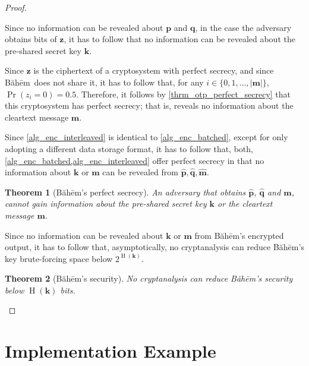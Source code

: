 \documentclass[twocolumn]{article}
\newcommand{\baheem}{Băhēm}
\DeclareMathOperator{\entropy}{H}
\newtheorem{theorem}{Theorem}[section]
\begin{document}
\begin{proof}
\begin{description}[itemsep=0em]
\begin{description}[itemsep=0em]
                Since no information can be revealed about $\mathbf{p}$ and
                $\mathbf{q}$, in the case the adversary obtains bits of
                $\mathbf{z}$, it has to follow that no information can be
                revealed about the pre-shared secret key $\mathbf{k}$.

            \item[$\mathbf{m} \oplus \mathbf{z} = \mathbf{\hat m}$.]  Since
                $\mathbf{z}$ is the ciphertext of a cryptosystem with
                perfect secrecy, and since \baheem\ does not share it, it
                has to follow that, for any $i \in \{0, 1, \ldots,
                |\mathbf{m}|\}$, $\Pr(z_i=0) = 0.5$.  Therefore, it follows
                by \cref{thrm_otp_perfect_secrecy} that this cryptosystem
                has perfect secrecy; that is, reveals no information about
                the cleartext message $\mathbf{m}$.
        \end{description}
\end{description}

Since \cref{alg_enc_interleaved} is identical to \cref{alg_enc_batched},
except for only adopting a different data storage format, it has to follow
that, both, \cref{alg_enc_batched,alg_enc_interleaved} offer perfect
secrecy in that no information about $\mathbf{k}$ or
$\mathbf{m}$ can be revealed from $\mathbf{\hat p},
\mathbf{\hat q}, \mathbf{\hat m}$.

\begin{theorem}[\baheem's perfect secrecy]
    An adversary that obtains $\mathbf{\hat p}$, $\mathbf{\hat q}$ and
    $\mathbf{\hat m}$, cannot gain information about the pre-shared secret
    key $\mathbf{k}$ or the cleartext message $\mathbf{m}$.
    \label{thrm_baheem_perfect_secrecy}
\end{theorem}

Since no information can be revealed about $\mathbf{k}$ or $\mathbf{m}$
from \baheem's encrypted output, it has to follow that, asymptotically, no
cryptanalysis can reduce \baheem's key brute-forcing space below
$2^{\entropy(\mathbf{k})}$.

\begin{theorem}[\baheem's security]
    No cryptanalysis can reduce \baheem's security below
    $\entropy(\mathbf{k})$ bits.
    \label{thrm_baheem_security}
\end{theorem}
\end{proof}

\section{Implementation Example}
\end{document}
